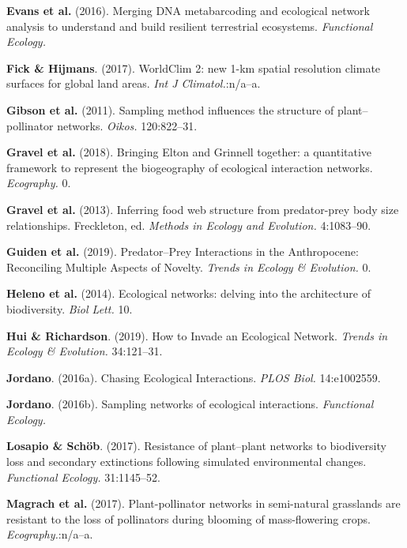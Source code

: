 \leavevmode\hypertarget{ref-EvanKits16}{}%
\textbf{Evans et al.} (2016). Merging DNA metabarcoding and ecological
network analysis to understand and build resilient terrestrial
ecosystems. \emph{Functional Ecology.}

\leavevmode\hypertarget{ref-FickHijm17}{}%
\textbf{Fick \& Hijmans}. (2017). WorldClim 2: new 1-km spatial
resolution climate surfaces for global land areas. \emph{Int J
Climatol.}:n/a--a.

\leavevmode\hypertarget{ref-GibsKnot11}{}%
\textbf{Gibson et al.} (2011). Sampling method influences the structure
of plant--pollinator networks. \emph{Oikos.} 120:822--31.

\leavevmode\hypertarget{ref-GravBais18}{}%
\textbf{Gravel et al.} (2018). Bringing Elton and Grinnell together: a
quantitative framework to represent the biogeography of ecological
interaction networks. \emph{Ecography.} 0.

\leavevmode\hypertarget{ref-GravPois13}{}%
\textbf{Gravel et al.} (2013). Inferring food web structure from
predator-prey body size relationships. Freckleton, ed. \emph{Methods in
Ecology and Evolution.} 4:1083--90.

\leavevmode\hypertarget{ref-GuidBart19}{}%
\textbf{Guiden et al.} (2019). Predator--Prey Interactions in the
Anthropocene: Reconciling Multiple Aspects of Novelty. \emph{Trends in
Ecology \& Evolution.} 0.

\leavevmode\hypertarget{ref-HeleGarc14}{}%
\textbf{Heleno et al.} (2014). Ecological networks: delving into the
architecture of biodiversity. \emph{Biol Lett.} 10.

\leavevmode\hypertarget{ref-HuiRich19}{}%
\textbf{Hui \& Richardson}. (2019). How to Invade an Ecological Network.
\emph{Trends in Ecology \& Evolution.} 34:121--31.

\leavevmode\hypertarget{ref-Jord16}{}%
\textbf{Jordano}. (2016a). Chasing Ecological Interactions. \emph{PLOS
Biol.} 14:e1002559.

\leavevmode\hypertarget{ref-Jord16a}{}%
\textbf{Jordano}. (2016b). Sampling networks of ecological interactions.
\emph{Functional Ecology.}

\leavevmode\hypertarget{ref-LosaScho17}{}%
\textbf{Losapio \& Schöb}. (2017). Resistance of plant--plant networks
to biodiversity loss and secondary extinctions following simulated
environmental changes. \emph{Functional Ecology.} 31:1145--52.

\leavevmode\hypertarget{ref-MagrHolz17}{}%
\textbf{Magrach et al.} (2017). Plant-pollinator networks in
semi-natural grasslands are resistant to the loss of pollinators during
blooming of mass-flowering crops. \emph{Ecography.}:n/a--a.

